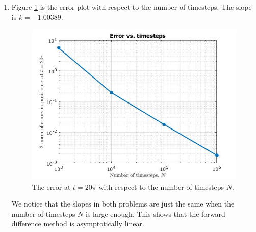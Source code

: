 \documentclass{article}
\begin{document}
\begin{enumerate}
\begin{enumerate}
\item
Figure \ref{problem 2.2} is the error plot with respect to the number of timesteps. The slope is $k = -1.00389$.
\begin{figure}[h]
\centering
\vbox{
\includegraphics[scale=0.6]{problem2/error.jpg}
}
\caption{The error at $t = 20\pi$ with respect to the number of timesteps $N$.}
\label{problem 2.2}
\end{figure}

We notice that the slopes in both problems are just the same when the number of timesteps $N$ is large enough. This shows that the forward difference method is asymptotically linear.

\end{enumerate}


\end{enumerate}
\end{document}
